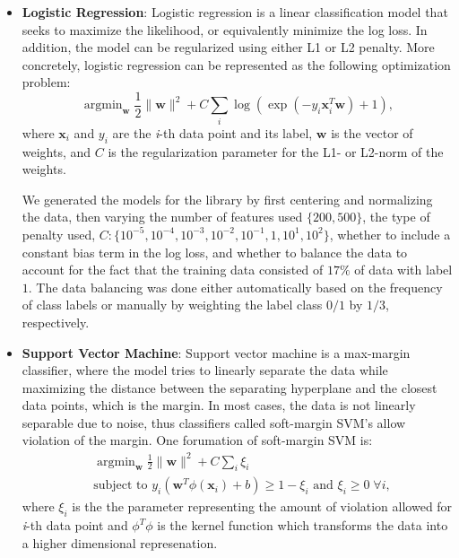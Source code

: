 \documentclass{article}
\renewcommand{\(}{\left(}
\renewcommand{\)}{\right)}
\DeclareMathOperator*{\argmin}{argmin}
\begin{document}
  \begin{itemize}
    \item \textbf{Logistic Regression}: Logistic regression is a linear classification model that seeks to maximize the likelihood, or equivalently minimize the log loss.  In addition, the model can be regularized using either L1 or L2 penalty.  More concretely, logistic regression can be represented as the following optimization problem:
      \begin{equation} \label{eq:logreg}
	\argmin_{\mathbf{w}} \frac{1}{2}\|\mathbf{w}\|^2 + C\sum_i\log\left(\exp\left(-y_i\mathbf{x}_i^T\mathbf{w}\right)+1\right),
      \end{equation}
      where $\mathbf{x}_i$ and $y_i$ are the \emph{i}-th data point and its label, $\mathbf{w}$ is the vector of weights, and $C$ is the regularization parameter for the L1- or L2-norm of the weights.

      We generated the models for the library by first centering and normalizing the data, then varying the number of features used $\{200, 500\}$, the type of penalty used, $C:\{10^{-5}, 10^{-4}, 10^{-3}, 10^{-2}, \allowbreak 10^{-1}, 1, 10^{1}, 10^{2}\}$, whether to include a constant bias term in the log loss, and whether to balance the data to account for the fact that the training data consisted of $17\%$ of data with label $1$.  The data balancing was done either automatically based on the frequency of class labels or manually by weighting the label class $0/1$ by $1/3$, respectively. 

    \item \textbf{Support Vector Machine}: Support vector machine is a max-margin classifier, where the model tries to linearly separate the data while maximizing the distance between the separating hyperplane and the closest data points, which is the margin. In most cases, the data is not linearly separable due to noise, thus classifiers called soft-margin SVM's allow violation of the margin.  One forumation of soft-margin SVM is:
      \begin{equation} \label{eq:svm}
	\begin{split}
	  &\argmin_{\mathbf{w}} \frac{1}{2}\|\mathbf{w}\|^2 + C\sum_i\xi_i \\
	  &\text{subject to } y_i \left(\mathbf{w}^T \phi(\mathbf{x}_i)+b\right)\ge 1-\xi_i \text{ and } \xi_i \ge 0\;\forall i,
	\end{split}
      \end{equation}
      where $\xi_i$ is the the parameter representing the amount of violation allowed for \emph{i}-th data point and $\phi^T\phi$ is the kernel function which transforms the data into a higher dimensional represenation. 


\end{itemize}
\end{document}
